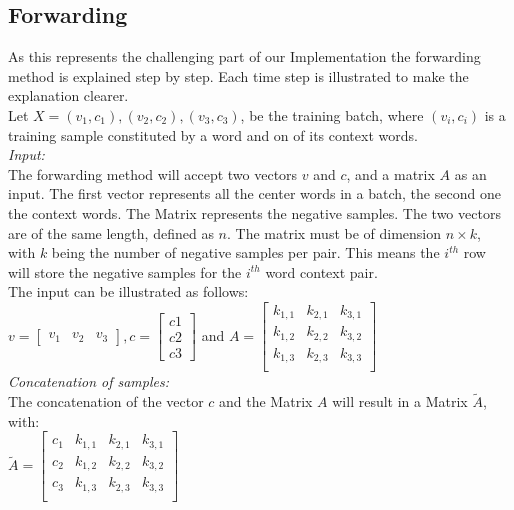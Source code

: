 \subsection{Forwarding}
As this represents the challenging part of our Implementation the forwarding method is explained step by step. Each time step is illustrated to make the explanation clearer.\\
Let $X = {(v_1,c_1),(v_2,c_2),(v_3,c_3)}$, be the training batch, where $(v_i,c_i)$ is a training sample constituted by a word and on of its context words. \\
\textit{Input:}\\
The forwarding method will accept two vectors $v$ and $c$, and a matrix $A$ as an input. The first vector represents all the center words in a batch, the second one the context words. The Matrix represents the negative samples. The two vectors are of the same length, defined as $n$. The matrix must be of dimension $n \times k$, with $k$ being the number of negative samples per pair. This means the $i^{th}$ row will store the negative samples for the $i^{th}$ word context pair.\\
The input can be illustrated as follows: \\
$v = \begin{bmatrix}
v_1 & v_2 & v_3
\end{bmatrix}, c = \begin{bmatrix}
c1\\
c2\\
c3\end{bmatrix}$ and $A =
\begin{bmatrix}
k_{1,1} & k_{2,1} & k_{3,1}\\
k_{1,2} & k_{2,2} & k_{3,2}\\
k_{1,3} & k_{2,3} & k_{3,3}\\
\end{bmatrix}$\\

\textit{Concatenation of samples:}\\
The concatenation of the vector $c$ and the Matrix $A$ will result in a Matrix $\tilde{A}$, with:\\
$\tilde{A} = \begin{bmatrix}
c_1 & k_{1,1} & k_{2,1} & k_{3,1}\\
c_2 & k_{1,2} & k_{2,2} & k_{3,2}\\
c_3 & k_{1,3} & k_{2,3}& k_{3,3}\\
\end{bmatrix}$\\

